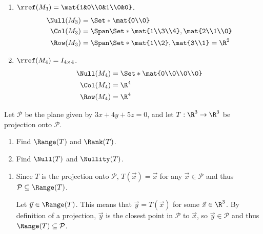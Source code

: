 \begin{exercises}
\begin{problist}
\begin{solution}
\begin{enumerate}
				\item $\rref(M_{3})=\mat{1&0\\0&1\\0&0}$.
					\begin{align*}
					\Null(M_{3})&=\Set*{\mat{0\\0}}\\
					\Col(M_{3})&=\Span\Set*{\mat{1\\3\\4},\mat{2\\1\\0}}\\
					\Row(M_{3})&=\Span\Set*{\mat{1\\2},\mat{3\\1}}=\R^{2}
					\end{align*}

				\item $\rref(M_{4})=I_{4\times4}$.
					\begin{align*}
					\Null(M_{4})&=\Set*{\mat{0\\0\\0\\0}}\\
					\Col(M_{4})&=\R^{4}\\
					\Row(M_{4})&=\R^{4}
					\end{align*}
			\end{enumerate}
		\end{solution}

		\prob Let $\mathcal P$ be the plane given by $3x+4y+5z=0$, and let $T:\R^{3}\to\R^{3}$
		be projection onto $\mathcal P$.
		\begin{enumerate}
			\item Find $\Range(T)$ and $\Rank(T)$.

			\item Find $\Null(T)$ and $\Nullity(T)$.
		\end{enumerate}


		\begin{solution}

			\begin{enumerate}
				\item
				Since $T$ is the projection onto $\mathcal{P}$, $T(\vec{x})=\vec{x}$ for any $\vec{x}\in\mathcal{P}$ and thus $\mathcal{P}\subseteq\Range(T)$.
				
				Let $\vec{y}\in\Range(T)$. This means that $\vec{y}=T(\vec{x})$ for some $\vec{x}\in\R^3$. By definition of a projection, $\vec{y}$ is the closest point in $\mathcal{P}$ to $\vec{x}$, so $\vec{y}\in\mathcal{P}$ and thus $\Range(T)\subseteq\mathcal{P}$.
				

\end{enumerate}
\end{solution}
\end{problist}
\end{exercises}

